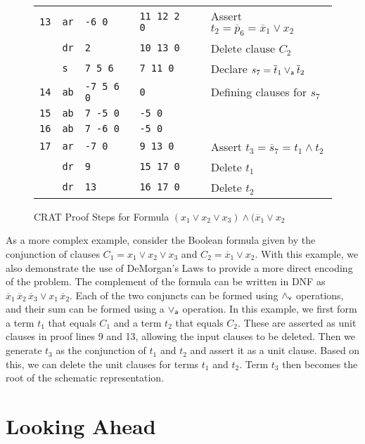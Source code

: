 \documentclass{llncs}
\newcommand{\pand}{\mathbin{\land_{\sf v}}}
\newcommand{\por}{\mathbin{\lor_{\sf a}}}
\newcommand{\obar}[1]{\overline{#1}}
\begin{document}
\begin{figure}
{\begin{tabular}{llllll}
    {\tt 13} & {\tt ar} & {\tt -6 0} & {\tt 11 12 2 0}  & & Assert $t_2 = \obar{p}_6 = \obar{x}_1 \lor x_2$ \\
            & {\tt dr}  & {\tt 2 } & {\tt 10 13 0} & & Delete clause $C_2$\\
            & {\tt s}   & {\tt 7 5 6}   & {\tt 7 11 0}  & & Declare $s_7 = \obar{t}_1 \por \obar{t}_2$ \\
    {\tt 14} & {\tt ab}  & {\tt -7 5 6 0}  & {\tt 0}    & & Defining clauses for $s_7$ \\ 
    {\tt 15} & {\tt ab}  & {\tt  7 -5 0}    & {\tt -5 0} &  \\  
    {\tt 16} & {\tt ab}  & {\tt  7 -6 0}    & {\tt -5 0} & &  \\
    {\tt 17} & {\tt ar}  & {\tt -7 0}       & {\tt 9 13 0} & & Assert $t_3 = \obar{s}_7 = t_1 \land t_2$ \\
             & {\tt dr}  & {\tt 9}          & {\tt 15 17 0} & & Delete $t_1$\\
             & {\tt dr}  & {\tt 13}         & {\tt 16 17 0} & & Delete $t_2$\\
  \end{tabular}
}  
  \caption{CRAT Proof Steps for Formula $(x_1 \lor x_2 \lor x_3) \land (\obar{x}_1 \lor x_2$}
  \label{fig:p2:crat}
\end{figure}

As a more complex example, consider the Boolean formula given by the
conjunction of clauses $C_1 = x_1 \lor x_2 \lor x_3$ and $C_2 =
\obar{x}_1 \lor x_2$.  With this example, we also demonstrate the use
of DeMorgan's Laws to provide a more direct encoding of the problem.
The complement of the formula can be written in DNF as
$\obar{x}_1\,\obar{x}_2\,\obar{x}_3 \lor x_1\,\obar{x}_2$.  Each of
the two conjuncts can be formed using $\pand$ operations, and their
sum can be formed using a $\por$ operation.  In this example, we first
form a term $t_1$ that equals $C_1$ and a term $t_2$ that equals
$C_2$.  These are asserted as unit clauses in proof lines 9 and 13,
allowing the input clauses to be deleted.  Then we generate $t_3$ as
the conjunction of $t_1$ and $t_2$ and assert it as a unit clause.
Based on this, we can delete the unit clauses for terms $t_1$ and
$t_2$.  Term $t_3$ then becomes the root of the schematic representation.





\section{Looking Ahead}
\end{document}
